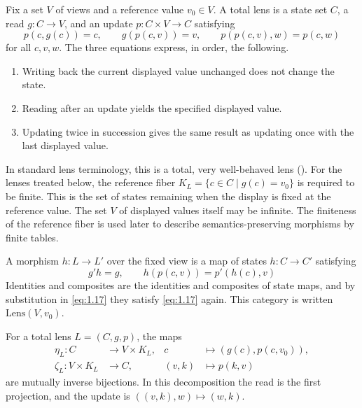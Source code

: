 \begin{definition}\label{def:1.32}

Fix a set $V$ of views and a reference value $v_0\in V$.
A total lens is a state set $C$, a read $g:C\to V$, and an update
$p:C\times V\to C$ satisfying
\begin{equation*}
p(c,g(c))=c,\qquad
g(p(c,v))=v,\qquad
p(p(c,v),w)=p(c,w)
\tag{1.16}\label{eq:1.16}
\end{equation*}
for all $c,v,w$.
The three equations express, in order, the following.

\begin{enumerate}
\item Writing back the current displayed value unchanged does not change the
state.
\item Reading after an update yields the specified displayed value.
\item Updating twice in succession gives the same result as updating once with
the last displayed value.
\end{enumerate}

In standard lens terminology, this is a total, very well-behaved lens
(\cite[\href{https://www.cis.upenn.edu/~bcpierce/papers/newlenses-full.pdf}{\S3.1}]{FGMPS04}).
For the lenses treated below, the reference fiber
$K_L=\{c\in C\mid g(c)=v_0\}$ is required to be finite.
This is the set of states remaining when the display is fixed at the reference
value.
The set $V$ of displayed values itself may be infinite.
The finiteness of the reference fiber is used later to describe
semantics-preserving morphisms by finite tables.

A morphism $h:L\to L'$ over the fixed view is a map of states $h:C\to C'$
satisfying
\begin{equation*}
g'h=g,\qquad h(p(c,v))=p'(h(c),v)
\tag{1.17}\label{eq:1.17}
\end{equation*}
Identities and composites are the identities and composites of state maps, and
by substitution in \eqref{eq:1.17} they satisfy \eqref{eq:1.17} again.
This category is written $\mathrm{Lens}(V,v_0)$.

\end{definition}

\begin{proposition}\label{prop:1.33}

For a total lens $L=(C,g,p)$, the maps
\begin{equation*}
\begin{aligned}
\eta_L:C&\longrightarrow V\times K_L,
&c&\longmapsto(g(c),p(c,v_0)),\\
\zeta_L:V\times K_L&\longrightarrow C,
&(v,k)&\longmapsto p(k,v)
\end{aligned}
\tag{1.18}\label{eq:1.18}
\end{equation*}
are mutually inverse bijections. In this decomposition the read is the first
projection, and the update is $((v,k),w)\mapsto(w,k)$.

\end{proposition}

